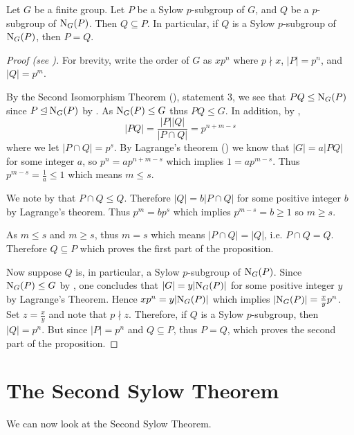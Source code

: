 \begin{proposition}\label{prop-normalizer-of-sylow-p-subgroup}
    Let $G$ be a finite group. Let $P$ be a Sylow $p$-subgroup of $G$, and $Q$ be a $p$-subgroup of $\mathrm{N}_{G}(P)$. Then $Q \subseteq P$. In particular, if $Q$ is a Sylow $p$-subgroup of $\mathrm{N}_{G}(P)$, then $P = Q$.
\end{proposition}
\begin{proof}[Proof (see {\cite[Proposition 11.9]{humphreys_1996}})]
    For brevity, write the order of $G$ as $xp^n$ where $p \nmid x$, $|P| = p^n$, and $|Q| = p^m$.

    By the Second Isomorphism Theorem (), statement 3, we see that $PQ \leq \mathrm{N}_{G}(P)$ since $P \unlhd \mathrm{N}_{G}(P)$ by . As $\mathrm{N}_{G}(P) \leq G$ thus $PQ \leq G$. In addition, by ,
    \[
        |PQ| = \frac{|P||Q|}{|P \cap Q|} = p^{n+m-s}
    \]
    where we let $|P \cap Q| = p^s$. By Lagrange's theorem () we know that $|G| = a|PQ|$ for some integer $a$, so $p^n = ap^{n+m-s}$ which implies $1 = ap^{m-s}$. Thus $p^{m-s} = \frac 1a \leq 1$ which means $m \leq s$.

    We note by  that $P \cap Q \leq Q$. Therefore $|Q| = b|P\cap Q|$ for some positive integer $b$ by Lagrange's theorem. Thus $p^m = bp^s$ which implies $p^{m-s} = b \geq 1$ so $m \geq s$.

    As $m \leq s$ and $m \geq s$, thus $m = s$ which means $|P \cap Q| = |Q|$, i.e. $P \cap Q = Q$. Therefore $Q \subseteq P$ which proves the first part of the proposition.

    Now suppose $Q$ is, in particular, a Sylow $p$-subgroup of $\mathrm{N}_{G}(P)$. Since $\mathrm{N}_{G}(P) \leq G$ by , one concludes that $|G| = y|\mathrm{N}_{G}(P)|$ for some positive integer $y$ by Lagrange's Theorem. Hence $xp^n = y|\mathrm{N}_{G}(P)|$ which implies $|\mathrm{N}_{G}(P)| = \frac{x}{y} p^n$. Set $z = \frac xy$ and note that $p \nmid z$. Therefore, if $Q$ is a Sylow $p$-subgroup, then $|Q| = p^n$. But since $|P| = p^n$ and $Q \subseteq P$, thus $P = Q$, which proves the second part of the proposition.
\end{proof}

\section{The Second Sylow Theorem}
We can now look at the Second Sylow Theorem.

